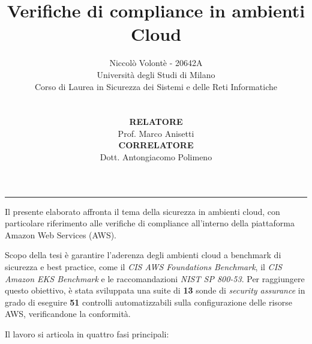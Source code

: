 \documentclass[11pt,a4paper]{article}
\title{\bfseries Verifiche di compliance in ambienti Cloud}
\author{Niccolò Volontè - 20642A\\[0.5em]
\normalsize Università degli Studi di Milano\\
\normalsize Corso di Laurea in Sicurezza dei Sistemi e delle Reti Informatiche\\
%
\\
\begin{minipage}[t]{0.45\textwidth}
\raggedright
\textbf{RELATORE}\\
Prof. Marco Anisetti
\end{minipage}
\hfill
\begin{minipage}[t]{0.45\textwidth}
\raggedleft
\textbf{CORRELATORE}\\
Dott. Antongiacomo Polimeno
\end{minipage}
}
\begin{document}
\maketitle
\vspace{1em}
\hrule
\vspace{1em}
Il presente elaborato affronta il tema della sicurezza in ambienti cloud, con particolare riferimento alle verifiche di compliance all'interno della piattaforma Amazon Web Services (AWS). 

Scopo della tesi è garantire l'aderenza degli ambienti cloud a benchmark di sicurezza e best practice, come il \emph{CIS AWS Foundations Benchmark}, il \emph{CIS Amazon EKS Benchmark} e le raccomandazioni \emph{NIST SP 800-53}. Per raggiungere questo obiettivo, è stata sviluppata una suite di \textbf{13} sonde di \emph{security assurance} in grado di eseguire \textbf{51} controlli automatizzabili sulla configurazione delle risorse AWS, verificandone la conformità.

Il lavoro si articola in quattro fasi principali:
\end{document}
